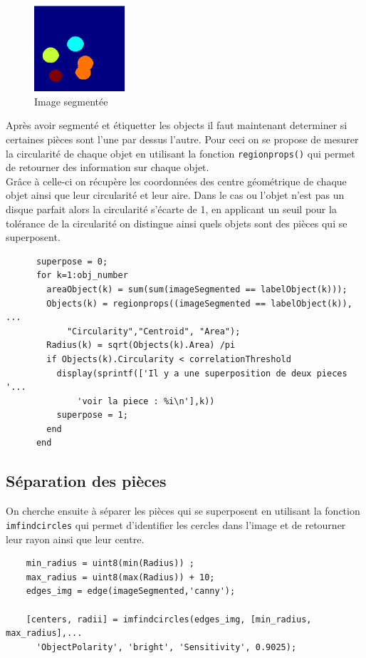 \documentclass[11pt, openright]{book}
\begin{document}
			\begin{figure}[ht!]
				\centering
				\includegraphics[width=0.3\textwidth]{./object/g10.png}
				\caption{Image segmentée}
			\end{figure}
			Après avoir segmenté et étiquetter les objects il faut maintenant determiner si certaines pièces sont l'une par dessus l'autre. Pour ceci on se propose de mesurer la circularité de chaque objet en utilisant la fonction \texttt{regionprops()} qui permet de retourner des information sur chaque objet. \\
			Grâce à celle-ci on récupère les coordonnées des centre géométrique de chaque objet ainsi que leur circularité et leur aire. Dans le cas ou l'objet n'est pas un disque parfait alors la circularité s'écarte de 1, en applicant un seuil pour la tolérance de la circularité on distingue ainsi quels objets sont des pièces qui se superposent.
			\begin{lstlisting}
      superpose = 0;
      for k=1:obj_number
        areaObject(k) = sum(sum(imageSegmented == labelObject(k)));
        Objects(k) = regionprops((imageSegmented == labelObject(k)), ...
            "Circularity","Centroid", "Area");
        Radius(k) = sqrt(Objects(k).Area) /pi 
        if Objects(k).Circularity < correlationThreshold
          display(sprintf(['Il y a une superposition de deux pieces '...
              'voir la piece : %i\n'],k))
          superpose = 1;
        end
      end
			\end{lstlisting}

		\subsection{Séparation des pièces}
			
			On cherche ensuite à séparer les pièces qui se superposent en utilisant la fonction \texttt{imfindcircles} qui permet d'identifier les cercles dans l'image et de retourner leur rayon ainsi que leur centre. 
			\begin{lstlisting}
	min_radius = uint8(min(Radius)) ;
	max_radius = uint8(max(Radius)) + 10;
	edges_img = edge(imageSegmented,'canny');

	[centers, radii] = imfindcircles(edges_img, [min_radius, max_radius],...
	  'ObjectPolarity', 'bright', 'Sensitivity', 0.9025);
			\end{lstlisting}
\end{document}
